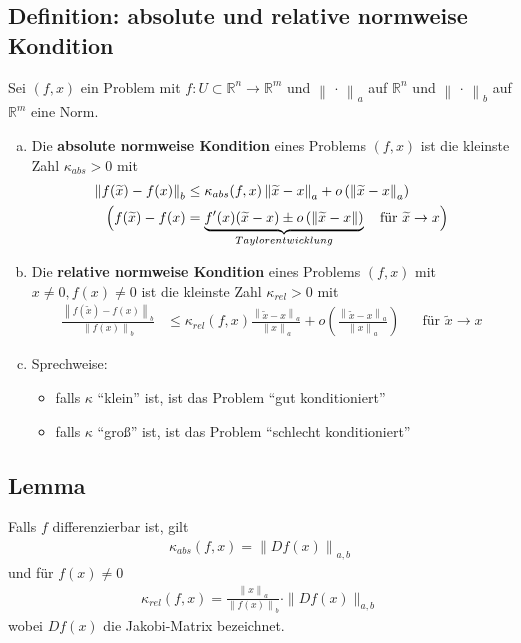 \documentclass[ngerman,fontsize=11pt, paper=a4, parskip=half, titlepage=true, toc=bib]{scrbook}
\newcommand{\R}{\mathds{R}}
\newcommand{\nn}[1]{\left\| #1 \right\|}
\begin{document}
  \subsection{Definition: absolute und relative normweise Kondition}
  Sei $(f,x)$ ein Problem mit $f:U\subset \R^n \rightarrow \R^m$
  und $\nn{\,\cdot\,}_a$ auf $\R^n$ und $\nn{\,\cdot\,}_b$ auf $\R^m$ eine Norm.
  \begin{enumerate}[a)]
  \item Die \textbf{absolute normweise Kondition} eines Problems $(f,x)$ ist die kleinste Zahl 
    $\kappa _{abs} > 0 $ mit
    \begin{align}
      \nn{f(\widetilde{x})-f(x)}_b &\leq \kappa _{abs}(f,x) \nn{\widetilde{x}-x}_a
                                     + o\left(\nn{\widetilde{x}-x}_a\right) \label{III.2.2} \\\nonumber
      \Bigl(f(\widetilde{x})- f(x) 
                                   &=\underbrace{ f'(x)(\widetilde{x}-x)\pm o\left(\nn{\widetilde{x}-x}\right)}_{Taylorentwicklung}
                                     \quad \text{für }\widetilde{x}\rightarrow x 
                                     \Bigr)
    \end{align}
  \item Die \textbf{relative normweise Kondition} eines Problems $(f,x)$  mit $x\neq 0, f(x) \neq 0$
    ist die kleinste Zahl 
    $\kappa _{rel} > 0 $ mit
    \begin{align}
      \frac{	\nn{f(\widetilde{x})-f(x)}_b }{\nn{f(x)}_b}
      &\leq \kappa _{rel}(f,x)\frac{ \nn{\widetilde{x}-x}_a}{\nn{x}_a}
        + 
        o\left(\frac{\nn{\widetilde{x}-x}_a}{\nn{x}_a}\right) \label{III.2.3}
      &&	\text{für } \widetilde{x} \rightarrow x
    \end{align}
  \item Sprechweise:
    \begin{itemize}
    \item falls $\kappa$ \enquote{klein} ist, ist das Problem \enquote{gut konditioniert}
    \item falls $\kappa$ \enquote{groß} ist, ist das Problem \enquote{schlecht konditioniert}
    \end{itemize}
  \end{enumerate}

  \subsection{Lemma} \label{3.2.8}
  Falls $f$ differenzierbar ist, gilt
  \begin{gather}
    \kappa_{abs}(f,x) = \nn{Df(x)}_{a,b} \label{III.2.4}
  \end{gather}
  und für $f(x) \neq 0$
  \begin{gather}
    \kappa_{rel}(f,x) = \frac{\nn{x}_a}{\nn{f(x)}_b}\cdot \|Df(x)\|_{a,b} \label{III.2.5}
  \end{gather}
  wobei $Df(x)$ die Jakobi-Matrix bezeichnet.
\end{document}
